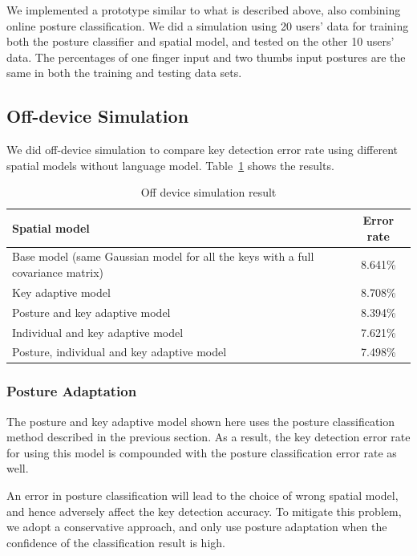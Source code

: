 \documentclass{sigchi}
\newcommand\tabhead[1]{\small\textbf{#1}}
\begin{document}
We implemented a prototype similar to what is described above, also combining
online posture classification. We did a simulation using 20 users' data for training
both the posture classifier and spatial model, and tested on the other 10 users' 
data. The percentages of one finger input and two thumbs input postures are the same in both the training and testing data sets.

\subsection{Off-device Simulation}
We did off-device simulation to compare
key detection error rate using different spatial models without language model.
Table~\ref{tab:off-device} shows the results.

\begin{table}[tb]
  \centering
  \begin{tabularx}{\columnwidth}{|X|c|}
  \hline
  \tabhead{Spatial model} & \tabhead{Error rate} \\
  \hline
  \multicolumn{1}{|p{0.7\columnwidth}|}{Base model (same Gaussian model for
    all the keys with a full covariance matrix)} & 8.641\% \\
  \hline
  Key adaptive model & 8.708\% \\
  \hline
  Posture and key adaptive model & 8.394\% \\
  \hline
  Individual and key adaptive model  & 7.621\%
  \\
  \hline
  Posture, individual and key adaptive model &  7.498\%
  \\
  \hline
  \end{tabularx}
  \caption{Off device simulation result}
  \label{tab:off-device}
\end{table}

\subsubsection{Posture Adaptation}\label{sec:off-device-posture}
The posture and key adaptive model shown here uses the posture classification
method described in the previous section. As a result, the
key detection error rate for using this model is compounded with the posture
classification error rate as well. 

An error in posture classification will lead to the choice of wrong spatial model,
and hence adversely affect the key detection accuracy. To mitigate this problem, we
adopt a conservative approach, and only use posture adaptation when the confidence of
the classification result is high.
\end{document}
